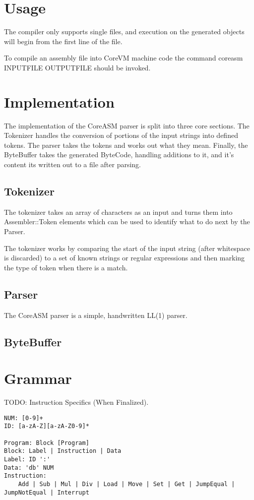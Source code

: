 \documentclass{article}
\begin{document}
\section* {Usage}

The compiler only supports single files, and execution on the generated objects will begin from the first line of the file.

To compile an assembly file into CoreVM machine code the command coreasm INPUTFILE OUTPUTFILE should be invoked.

\section* {Implementation}

The implementation of the CoreASM parser is split into three core sections. The Tokenizer handles the conversion of portions of the input strings into defined tokens.
The parser takes the tokens and works out what they mean. Finally, the ByteBuffer takes the generated ByteCode, handling additions to it, and it's content its written
out to a file after parsing.

\subsection* {Tokenizer}

The tokenizer takes an array of characters as an input and turns them into Assembler::Token elements which can be used to identify what to do next by the Parser.

The tokenizer works by comparing the start of the input string (after whitespace is discarded) to a set of known strings or regular expressions and then marking the type of token when there is a match.

\subsection* {Parser}

The CoreASM parser is a simple, handwritten LL(1) parser. 

\subsection* {ByteBuffer}

\section* {Grammar}
TODO: Instruction Specifics (When Finalized).
\begin{verbatim}
NUM: [0-9]+
ID: [a-zA-Z][a-zA-Z0-9]*

Program: Block [Program]
Block: Label | Instruction | Data
Label: ID ':'
Data: 'db' NUM
Instruction:
	Add | Sub | Mul | Div | Load | Move | Set | Get | JumpEqual | JumpNotEqual | Interrupt
\end{verbatim}
\end{document}
